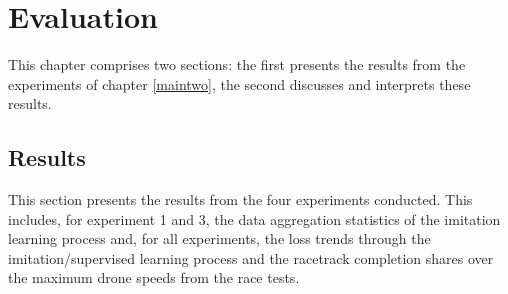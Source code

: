 \chapter{Evaluation}
\label{evaluation}
This chapter comprises two sections:
the first presents the results from the experiments of chapter \ref{maintwo},
the second discusses and interprets these results.


\section{Results}
\label{results}
\providecommand{\gfxwidth}{}\renewcommand{\gfxwidth}{0.8\textwidth}
This section presents the results from the four experiments conducted.
This includes, for experiment 1 and 3, the data aggregation statistics of the imitation learning process
and, for all experiments, the loss trends through the imitation/supervised learning process
and the racetrack completion shares over the maximum drone speeds from the race tests.


